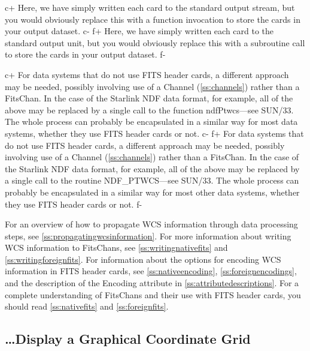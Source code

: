 \documentclass[twoside,11pt]{article}
\newcommand{\xref}[3]{#1}
\newcommand{\appref}[1]{Appendix~\ref{#1}}
\newcommand{\secref}[1]{\S\ref{#1}}
\renewcommand{\appref}[1]{\ref{#1}}
\renewcommand{\secref}[1]{\ref{#1}}
\begin{document}
c+
Here, we have simply written each card to the standard output stream,
but you would obviously replace this with a function invocation to
store the cards in your output dataset.
c-
f+
Here, we have simply written each card to the standard output unit,
but you would obviously replace this with a subroutine call to store
the cards in your output dataset.
f-

c+
For data systems that do not use FITS header cards, a different
approach may be needed, possibly involving use of a Channel
(\secref{ss:channels}) rather than a FitsChan.  In the case of the
Starlink NDF data format, for example, all of the above may be
replaced by a single call to the function
\xref{ndfPtwcs}{sun33}{ndfPtwcs}---see \xref{SUN/33}{sun33}{}. The
whole process can probably be encapsulated in a similar way for most
data systems, whether they use FITS header cards or not.
c-
f+
For data systems that do not use FITS header cards, a different
approach may be needed, possibly involving use of a Channel
(\secref{ss:channels}) rather than a FitsChan.  In the case of the
Starlink NDF data format, for example, all of the above may be
replaced by a single call to the routine
\xref{NDF\_PTWCS}{sun33}{NDF_PTWCS}---see \xref{SUN/33}{sun33}{}. The
whole process can probably be encapsulated in a similar way for most
other data systems, whether they use FITS header cards or not.
f-

For an overview of how to propagate WCS information through data
processing steps, see \secref{ss:propagatingwcsinformation}.  For more
information about writing WCS information to FitsChans, see
\secref{ss:writingnativefits} and \secref{ss:writingforeignfits}.  For
information about the options for encoding WCS information in FITS
header cards, see \secref{ss:nativeencoding},
\secref{ss:foreignencodings}, and the description of the Encoding
attribute in \appref{ss:attributedescriptions}.  For a complete
understanding of FitsChans and their use with FITS header cards, you
should read \secref{ss:nativefits} and \secref{ss:foreignfits}.

\subsection{\label{ss:howtoplotgrid}\ldots Display a Graphical Coordinate Grid}
\end{document}
